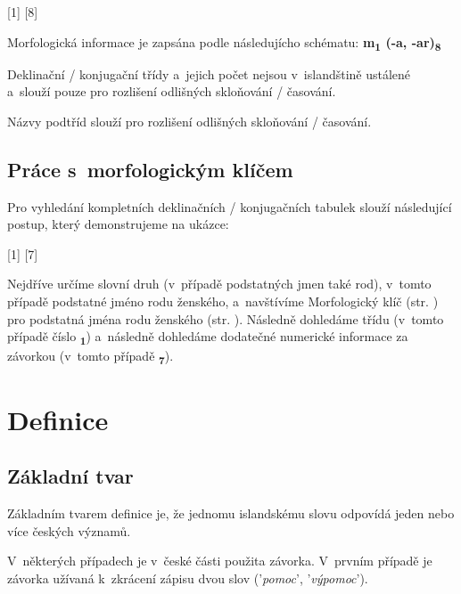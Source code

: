 \blspace
  \dicEntry {} [1] [8]
\blspace

Morfologická informace je zapsána podle následujícho schématu: \textbf{m{\textsubscript{1}} (-a, -ar){\textsubscript{8}} }

\tableB

Deklinační / konjugační třídy a~jejich počet nejsou v~islandštině ustálené a~slouží pouze pro rozlišení odlišných skloňování / časování.

Názvy podtříd slouží pro rozlišení odlišných skloňování / časování.

\subsection*{Práce s~morfologickým klíčem}

Pro vyhledání kompletních deklinačních / konjugačních tabulek slouží následující postup, který demonstrujeme na ukázce:

\blspace
  \dicEntry {} [1] [7]
\blspace

Nejdříve určíme slovní druh (v~případě podstatných jmen také rod), v~tomto případě podstatné jméno rodu ženského, a~navštívíme Morfologický klíč (str. \pageref{sec:morpho}) pro podstatná jména rodu ženského (str. \pageref{sec:morpho_f}).
Následně dohledáme třídu (v~tomto případě číslo {\textsubscript{\textbf{1}}}) a~následně dohledáme dodatečné numerické informace za závorkou (v~tomto případě {\textsubscript{\textbf{7}}}).

\tableC

\section{Definice}

\subsection*{Základní tvar}

Základním tvarem definice je, že jednomu islandskému slovu odpovídá jeden nebo více českých významů.

\blspace
  \dicEntry {}   
\blspace

V~některých případech je v~české části použita závorka. V~prvním případě je závorka užívaná k~zkrácení zápisu dvou slov ('\textit{pomoc}', '\textit{výpomoc}').


